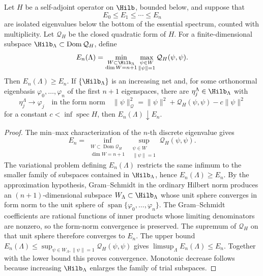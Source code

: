 \begin{lemma}
\label{lem:rayleigh-ritz-fixed-hamiltonian}
Let \(H\) be a self-adjoint operator on \(\Hilb\), bounded below, and suppose
that
\[
  E_0\le E_1\le\cdots\le E_n
\]
are isolated eigenvalues below the bottom of the essential spectrum, counted
with multiplicity.  Let \(\mathcal Q_H\) be the closed quadratic form of
\(H\).  For a finite-dimensional subspace
\(\Hilb_\Lambda\subset\operatorname{Dom}\mathcal Q_H\), define
\[
  E_n(\Lambda)
  =
  \min_{\substack{W\subset\Hilb_\Lambda\\ \dim W=n+1}}
  \max_{\substack{\psi\in W\\ \|\psi\|=1}}\mathcal Q_H(\psi,\psi).
\]
Then \(E_n(\Lambda)\ge E_n\).  If \(\{\Hilb_\Lambda\}\) is an increasing net
and, for some orthonormal eigenbasis
\(\varphi_0,\ldots,\varphi_n\) of the first \(n+1\) eigenspaces, there are
\(\eta_j^\Lambda\in\Hilb_\Lambda\) with
\[
  \eta_j^\Lambda\to\varphi_j
  \quad\text{in the form norm}\quad
  \|\psi\|_{\mathcal Q}^2
  =
  \|\psi\|^2+\mathcal Q_H(\psi,\psi)-c\|\psi\|^2
\]
for a constant \(c<\inf\operatorname{spec}H\), then
\(E_n(\Lambda)\downarrow E_n\).
\end{lemma}

\begin{proof}
The min--max characterization of the \(n\)-th discrete eigenvalue gives
\[
  E_n
  =
  \inf_{\substack{W\subset\operatorname{Dom}\mathcal Q_H\\ \dim W=n+1}}
  \sup_{\substack{\psi\in W\\ \|\psi\|=1}}\mathcal Q_H(\psi,\psi).
\]
The variational problem defining \(E_n(\Lambda)\) restricts the same infimum
to the smaller family of subspaces contained in \(\Hilb_\Lambda\), hence
\(E_n(\Lambda)\ge E_n\).  By the approximation hypothesis, Gram--Schmidt in
the ordinary Hilbert norm produces an \((n+1)\)-dimensional subspace
\(W_\Lambda\subset\Hilb_\Lambda\) whose unit sphere converges in form norm to
the unit sphere of
\(\operatorname{span}\{\varphi_0,\ldots,\varphi_n\}\).  The Gram--Schmidt
coefficients are rational functions of inner products whose limiting
denominators are nonzero, so the form-norm convergence is preserved.  The
supremum of \(\mathcal Q_H\) on that unit sphere therefore converges to
\(E_n\).
The upper bound \(E_n(\Lambda)\le \sup_{\psi\in W_\Lambda,\|\psi\|=1}
\mathcal Q_H(\psi,\psi)\) gives \(\limsup_\Lambda E_n(\Lambda)\le E_n\).
Together with the lower bound this proves convergence.  Monotonic decrease
follows because increasing \(\Hilb_\Lambda\) enlarges the family of trial
subspaces.
\end{proof}

